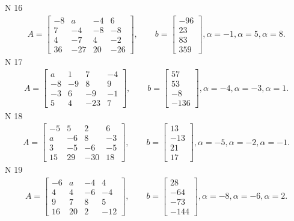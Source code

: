 \documentclass[11pt]{report}
\begin{document}
N 16
\begin{align*}
 A = \left[\begin{matrix}-8 & a & -4 & 6\\7 & -4 & -8 & -8\\4 & -7 & 4 & -2\\36 & -27 & 20 & -26\end{matrix}\right],
    \qquad b = \left[\begin{matrix}-96\\23\\83\\359\end{matrix}\right], \alpha = -1, \alpha = 5, \alpha = 8. 
 \end{align*}
N 17
\begin{align*}
 A = \left[\begin{matrix}a & 1 & 7 & -4\\-8 & -9 & 8 & 9\\-3 & 6 & -9 & -1\\5 & 4 & -23 & 7\end{matrix}\right],
    \qquad b = \left[\begin{matrix}57\\53\\-8\\-136\end{matrix}\right], \alpha = -4, \alpha = -3, \alpha = 1. 
 \end{align*}
N 18
\begin{align*}
 A = \left[\begin{matrix}-5 & 5 & 2 & 6\\a & -6 & 8 & -3\\3 & -5 & -6 & -5\\15 & 29 & -30 & 18\end{matrix}\right],
    \qquad b = \left[\begin{matrix}13\\-13\\21\\17\end{matrix}\right], \alpha = -5, \alpha = -2, \alpha = -1. 
 \end{align*}
N 19
\begin{align*}
 A = \left[\begin{matrix}-6 & a & -4 & 4\\4 & 4 & -6 & -4\\9 & 7 & 8 & 5\\16 & 20 & 2 & -12\end{matrix}\right],
    \qquad b = \left[\begin{matrix}28\\-64\\-73\\-144\end{matrix}\right], \alpha = -8, \alpha = -6, \alpha = 2. 
 \end{align*}
\end{document}
